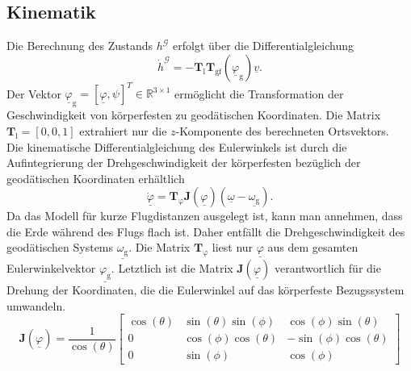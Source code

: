 \subsection{Kinematik}
Die Berechnung des Zustands $h^\mathcal{G}$ erfolgt über die Differentialgleichung 
\begin{equation}
\label{fun:hoehe}
\dot{h}^\mathcal{G} = -\textbf{T}_\mathrm{l}\textbf{T}_\mathrm{gf}(\underline{\varphi}_\mathrm{g})\underline{v}.
\end{equation}
Der Vektor $\underline{\varphi}_\mathrm{g} = [\underline{\varphi},\psi]^T \in \mathbb{R}^{3\times 1}$ ermöglicht die Transformation der Geschwindigkeit von körperfesten zu geodätischen Koordinaten. Die Matrix $\textbf{T}_\mathrm{l} = [0, 0, 1]$ extrahiert nur die $z$-Komponente des berechneten Ortsvektors.\\
Die kinematische Differentialgleichung des Eulerwinkels ist durch die Aufintegrierung der Drehgeschwindigkeit der körperfesten bezüglich der geodätischen Koordinaten erhältlich
\begin{equation}
\label{fun:KinEuler}
\underline{\dot{\varphi}} = \textbf{T}_\mathrm{\varphi}\textbf{J}(\underline{\varphi})(\underline{\omega}-\underline{\omega_\mathrm{g}}).
\end{equation}
Da das Modell für kurze Flugdistanzen ausgelegt ist, kann man annehmen, dass die Erde während des Flugs flach ist. Daher entfällt die Drehgeschwindigkeit des geodätischen Systems $\underline{\omega_\mathrm{g}}$. Die Matrix $\textbf{T}_\mathrm{\varphi}$ liest nur $\underline{\varphi}$ aus dem gesamten Eulerwinkelvektor $\underline{\varphi_\mathrm{g}}$. Letztlich ist die Matrix $\textbf{J}(\underline{\varphi})$ verantwortlich für die Drehung der Koordinaten, die die Eulerwinkel auf das körperfeste Bezugssystem umwandeln.
\begin{equation}
\textbf{J}(\underline{\varphi}) = \dfrac{1}{\cos(\theta)}\begin{bmatrix} 
\cos(\theta) & \sin(\theta)\sin(\phi)&\cos(\phi)\sin(\theta)\\
0&\cos(\phi)\cos(\theta)&-\sin(\phi)\cos(\theta)\\
0&\sin(\phi)& \cos(\phi)
\end{bmatrix}
\end{equation}
